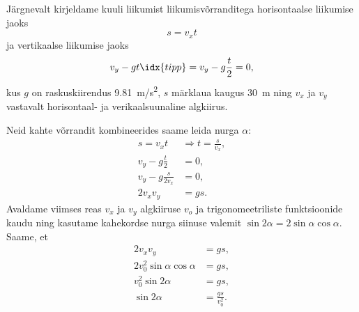 \documentclass[11pt, twoside]{article}
\begin{document}
{{Järgnevalt kirjeldame kuuli liikumist liikumisvõrranditega horisontaalse liikumise jaoks
$$
s=v_{x}t
$$
ja vertikaalse liikumise jaoks
$$
v_{y}-gt\idx{tipp}=v_{y}-g\frac{t}{2}=0,
$$
kus $g$ on raskuskiirendus \SI{9,81}{m/s^2}, $s$ märklaua kaugus \SI{30}{m} ning $v_x$ ja $v_y$ vastavalt horisontaal- ja verikaalsuunaline algkiirus.

Neid kahte võrrandit kombineerides saame leida nurga $\alpha$:
\begin{align*}
s=v_{x}t & \Rightarrow t=\frac{s}{v_{x}},\\
v_{y}-g\frac{t}{2} & = 0,\\
v_{y}-g\frac{s}{2v_{x}} & = 0,\\
2v_{x}v_{y} & = gs.
\end{align*}
Avaldame viimses reas $v_x$ ja $v_y$ algkiiruse $v_o$ ja trigonomeetriliste funktsioonide kaudu ning kasutame kahekordse nurga siinuse valemit 
$\sin2\alpha = 2\sin\alpha\cos\alpha$. Saame, et 
\begin{align*}
2v_{x}v_{y} & = gs,\\
2v_{0}^{2}\sin\alpha\cos\alpha & = gs,\\
v_{0}^{2}\sin2\alpha & = gs,\\
\sin2\alpha & = \frac{gs}{v_{0}^{2}}.
\end{align*}

}}
\end{document}
